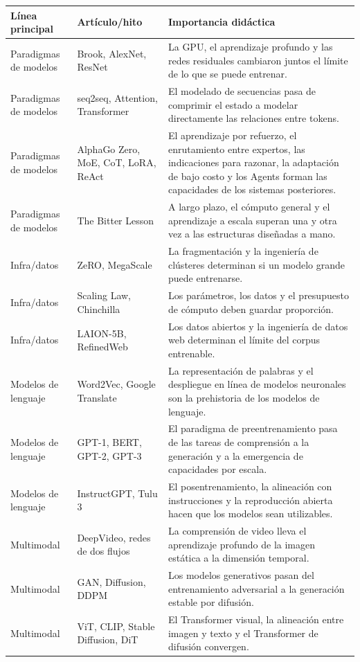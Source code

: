 \documentclass[a4paper]{article}
\begin{document}
\begin{longtable}{p{}p{}p{}}
\toprule
Línea principal & Artículo/hito & Importancia didáctica \\
\midrule
Paradigmas de modelos & Brook, AlexNet, ResNet & La GPU, el aprendizaje profundo y las redes residuales cambiaron juntos el límite de lo que se puede entrenar. \\
Paradigmas de modelos & seq2seq, Attention, Transformer & El modelado de secuencias pasa de comprimir el estado a modelar directamente las relaciones entre tokens. \\
Paradigmas de modelos & AlphaGo Zero, MoE, CoT, LoRA, ReAct & El aprendizaje por refuerzo, el enrutamiento entre expertos, las indicaciones para razonar, la adaptación de bajo costo y los Agents forman las capacidades de los sistemas posteriores. \\
Paradigmas de modelos & The Bitter Lesson & A largo plazo, el cómputo general y el aprendizaje a escala superan una y otra vez a las estructuras diseñadas a mano. \\
Infra/datos & ZeRO, MegaScale & La fragmentación y la ingeniería de clústeres determinan si un modelo grande puede entrenarse. \\
Infra/datos & Scaling Law, Chinchilla & Los parámetros, los datos y el presupuesto de cómputo deben guardar proporción. \\
Infra/datos & LAION-5B, RefinedWeb & Los datos abiertos y la ingeniería de datos web determinan el límite del corpus entrenable. \\
Modelos de lenguaje & Word2Vec, Google Translate & La representación de palabras y el despliegue en línea de modelos neuronales son la prehistoria de los modelos de lenguaje. \\
Modelos de lenguaje & GPT-1, BERT, GPT-2, GPT-3 & El paradigma de preentrenamiento pasa de las tareas de comprensión a la generación y a la emergencia de capacidades por escala. \\
Modelos de lenguaje & InstructGPT, Tulu 3 & El posentrenamiento, la alineación con instrucciones y la reproducción abierta hacen que los modelos sean utilizables. \\
Multimodal & DeepVideo, redes de dos flujos & La comprensión de video lleva el aprendizaje profundo de la imagen estática a la dimensión temporal. \\
Multimodal & GAN, Diffusion, DDPM & Los modelos generativos pasan del entrenamiento adversarial a la generación estable por difusión. \\
Multimodal & ViT, CLIP, Stable Diffusion, DiT & El Transformer visual, la alineación entre imagen y texto y el Transformer de difusión convergen. \\
\bottomrule
\end{longtable}
\end{document}

